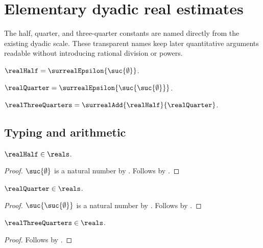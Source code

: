 



\section{Elementary dyadic real estimates}

The half, quarter, and three-quarter constants are named directly from the
existing dyadic scale.  These transparent names keep later quantitative
arguments readable without introducing rational division or powers.

\begin{definition}\label{real_half}
    $\realHalf=\surrealEpsilon{\suc{\emptyset}}$.
\end{definition}

\begin{definition}\label{real_quarter}
    $\realQuarter=\surrealEpsilon{\suc{\suc{\emptyset}}}$.
\end{definition}

\begin{definition}\label{real_three_quarters}
    $\realThreeQuarters=\surrealAdd{\realHalf}{\realQuarter}$.
\end{definition}

\subsection{Typing and arithmetic}

\begin{proposition}\label{real_half_is_real}
    $\realHalf\in\reals$.
\end{proposition}
\begin{proof}
    $\suc{\emptyset}$ is a natural number by .
    Follows by .
\end{proof}

\begin{proposition}\label{real_quarter_is_real}
    $\realQuarter\in\reals$.
\end{proposition}
\begin{proof}
    $\suc{\suc{\emptyset}}$ is a natural number
        by .
    Follows by .
\end{proof}

\begin{proposition}\label{real_three_quarters_is_real}
    $\realThreeQuarters\in\reals$.
\end{proposition}
\begin{proof}
    Follows by
        .
\end{proof}

